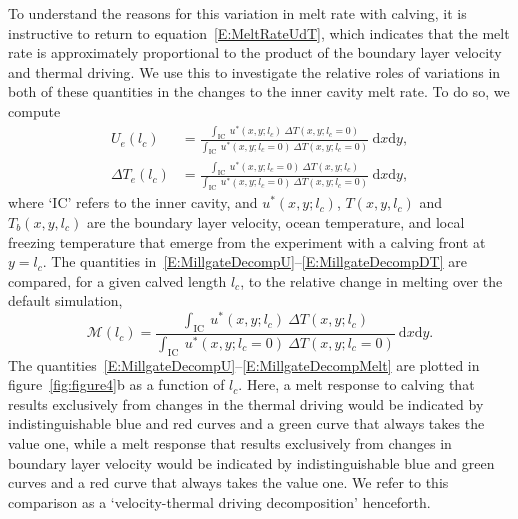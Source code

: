 \documentclass[draft]{agujournal2019}
\begin{document}
To understand the reasons for this variation in melt rate with calving, it is instructive to return to equation~\eqref{E:MeltRateUdT}, which indicates that the melt rate is approximately proportional to the product of the boundary layer velocity and thermal driving. We use this to investigate the relative roles of variations in both of these quantities in the changes to the inner cavity melt rate. To do so, we compute~\cite{Millgate2013JGROceans}
 \begin{align}
U_{e}(l_c) &=  \frac{\int_{\text{IC}}~u^*(x,y; l_c)~\Delta T(x,y;l_c = 0)}{\int_{\text{IC}}~ u^*(x,y; l_c = 0)~\Delta T(x,y;l_c = 0)}~\mathrm{d}x\mathrm{d}y, \label{E:MillgateDecompU}\\ \Delta T_{e}(l_c) &=  \frac{\int_{\text{IC}}~u^*(x,y; l_c=0)~\Delta T(x,y;l_c)}{\int_{\text{IC}}~ u^*(x,y; l_c = 0)~\Delta T(x,y;l_c = 0)}~\mathrm{d}x\mathrm{d}y, \label{E:MillgateDecompDT}
 \end{align}
where `IC' refers to the inner cavity, and $u^*(x,y;l_c)$, $T(x,y,l_c)$ and $T_b(x,y,l_c)$ are the boundary layer velocity, ocean temperature, and local freezing temperature that emerge from the experiment with a calving front at $y = l_c$. The quantities in~\eqref{E:MillgateDecompU}--\eqref{E:MillgateDecompDT} are compared, for a given calved length $l_c$, to the relative change in melting over the default simulation,
 \begin{equation}\label{E:MillgateDecompMelt}
   \mathcal{M}(l_c) =  \frac{\int_{\text{IC}}~u^*(x,y; l_c)~\Delta T(x,y;l_c)}{\int_{\text{IC}}~ u^*(x,y; l_c = 0)~\Delta T(x,y;l_c = 0)}~\mathrm{d}x\mathrm{d}y.
 \end{equation}
The quantities~\eqref{E:MillgateDecompU}--\eqref{E:MillgateDecompMelt} are plotted in figure~\ref{fig:figure4}b as a function of $l_c$.  Here, a melt response to calving that results exclusively from changes in the thermal driving would be indicated by indistinguishable blue and red curves and a green curve that always takes the value one, while a melt response that results exclusively from changes in boundary layer velocity would be indicated by indistinguishable blue and green curves and a red curve that always takes the value one. We refer to this comparison as a `velocity-thermal driving decomposition' henceforth. %
\end{document}
